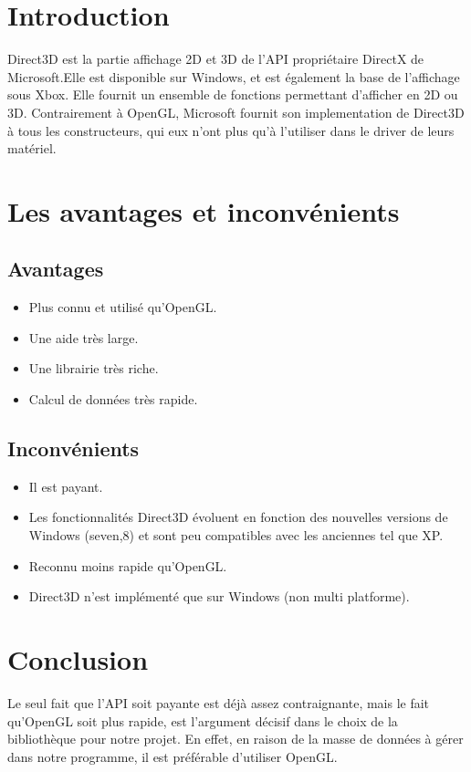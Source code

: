 \section{Introduction}
Direct3D est la partie affichage 2D et 3D de l'API propriétaire DirectX de Microsoft.Elle est disponible sur Windows, et est également la base de l'affichage sous Xbox. 
\newline
Elle fournit un ensemble de fonctions permettant d'afficher en 2D ou 3D.
\newline
Contrairement à OpenGL, Microsoft fournit son implementation de Direct3D à tous les constructeurs, qui eux n'ont plus qu'à l'utiliser dans le driver de leurs matériel.
  
\section{Les avantages et inconvénients}
\subsection{Avantages}
\begin{itemize}
\item Plus connu et utilisé qu'OpenGL.
\item Une aide très large.
\item Une librairie très riche.
\item Calcul de données très rapide.
\end{itemize}

\subsection{Inconvénients}
\begin{itemize}
\item Il est payant.
\item Les fonctionnalités Direct3D évoluent en fonction des nouvelles versions de Windows (seven,8) et sont peu compatibles avec les anciennes tel que XP. 
\item Reconnu moins rapide qu'OpenGL.
\item Direct3D n'est implémenté que sur Windows (non multi platforme).
\end{itemize}

\section{Conclusion}
Le seul fait que l'API soit payante est déjà assez contraignante, mais le fait qu'OpenGL soit plus rapide, est l'argument décisif dans le choix de la bibliothèque pour notre projet. En effet, en raison de la masse de données à gérer dans notre programme, il est préférable d'utiliser OpenGL.